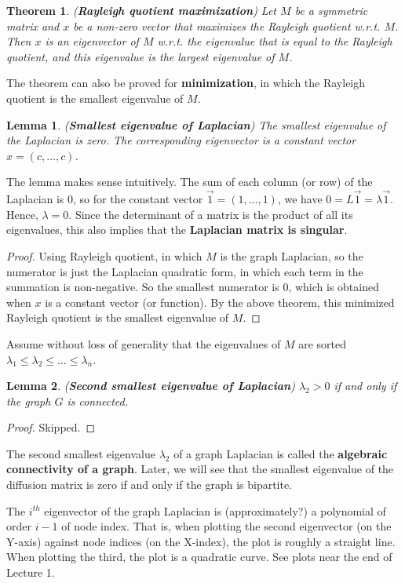 \documentclass[]{article}
\newtheorem{theorem}{Theorem}[section]
\newtheorem{lemma}{Lemma}[section]
\begin{document}
	\begin{theorem} (\textbf{Rayleigh quotient maximization})
		Let $M$ be a symmetric matrix and $x$ be a non-zero vector that maximizes the Rayleigh quotient w.r.t. $M$. Then $x$ is an eigenvector of $M$ w.r.t. the eigenvalue that is equal to the Rayleigh quotient, and this eigenvalue is the largest eigenvalue of $M$. 
	\end{theorem}
	The theorem can also be proved for \textbf{minimization}, in which the Rayleigh quotient is the smallest eigenvalue of $M$. 
	
	\begin{lemma} (\textbf{Smallest eigenvalue of Laplacian})
		\label{lemma:smallest eigenvalue of laplacian}
		The smallest eigenvalue of the Laplacian is zero. The corresponding eigenvector is a constant vector $x=(c,\dots, c)$.
	\end{lemma}
	The lemma makes sense intuitively. The sum of each column (or row) of the Laplacian is 0, so for the constant vector $\vec{1} = (1, \dots, 1)$, we have $0 = L \vec{1} = \lambda \vec{1}$. Hence, $\lambda=0$. Since the determinant of a matrix is the product of all its eigenvalues, this also implies that the \textbf{Laplacian matrix is singular}. 
	\begin{proof}
		Using Rayleigh quotient, in which $M$ is the graph Laplacian, so the numerator is just the Laplacian quadratic form, in which each term in the summation is non-negative. So the smallest numerator is $0$, which is obtained when $x$ is a constant vector (or function). By the above theorem, this minimized Rayleigh quotient is the smallest eigenvalue of $M$. 
	\end{proof}
	
	Assume without loss of generality that the eigenvalues of $M$ are sorted $\lambda_1 \le \lambda_2 \le \dots \le \lambda_n$. 
	
	\begin{lemma} (\textbf{Second smallest eigenvalue of Laplacian})
		$\lambda_2 > 0$ if and only if the graph $G$ is connected. 
	\end{lemma}
	\begin{proof}
		Skipped.
	\end{proof}
	
	The second smallest eigenvalue $\lambda_2$ of a graph Laplacian is called the \textbf{algebraic connectivity of a graph}. Later, we will see that the smallest eigenvalue of the diffusion matrix is zero if and only if the graph is bipartite. 
	
	The $i^{th}$ eigenvector of the graph Laplacian is (approximately?) a polynomial of order $i-1$ of node index. That is, when plotting the second eigenvector (on the Y-axis) against node indices (on the X-index), the plot is roughly a straight line. When plotting the third, the plot is a quadratic curve. See plots near the end of Lecture 1. 
	
\end{document}

